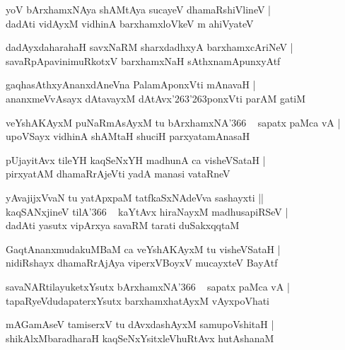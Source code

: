 \documentclass[twoside,12pt,openright]{book}
\def\S{\char'263}
\newcounter{shloka}[chapter]
\begin{document}
\begin{shloka}
yoV bArxhamxNAya shAMtAya sucayeV dhamaRshiVlineV |\\
dadAti vidAyxM vidhinA barxhamxloVkeV m ahiVyateV 
\end{shloka}

\begin{shloka}
dadAyxdaharahaH savxNaRM sharxdadhxyA barxhamxcAriNeV |\\
savaRpApavinimuRkotxV barxhamxNaH sAthxnamApunxyAtf 
\end{shloka}

\begin{shloka}
gaqhasAthxyAnanxdAneVna PalamAponxVti mAnavaH |\\
ananxmeVvAsayx dAtavayxM dAtAvx\S\S ponxVti parAM  gatiM 
\end{shloka}

\begin{shloka}
veYshAKAyxM puNaRmAsAyxM tu bArxhamxNA\char'366 ~ sapatx paMca vA |\\
upoVSayx vidhinA shAMtaH shuciH parxyatamAnasaH 
\end{shloka}

\begin{shloka}
pUjayitAvx tileYH kaqSeNxYH madhunA ca visheVSataH |\\
pirxyatAM dhamaRrAjeVti yadA manasi vataRneV 
\end{shloka}

\begin{shloka}
yAvajijxVvaN  tu yatApxpaM tatfkaSxNAdeVva sashayxti ||\\
kaqSANxjineV tilA\char'366 ~ kaYtAvx hiraNayxM madhusapiRSeV |\\
dadAti yasutx vipArxya savaRM tarati duSakxqqtaM 
\end{shloka}

\begin{shloka}
GaqtAnanxmudakuMBaM ca veYshAKAyxM tu visheVSataH |\\
nidiRshayx dhamaRrAjAya viperxVBoyxV mucayxteV BayAtf 
\end{shloka}

\begin{shloka}
savaNARtilayuketxYsutx bArxhamxNA\char'366 ~ sapatx paMca vA |\\
tapaRyeVdudapaterxYsutx barxhamxhatAyxM vAyxpoVhati 
\end{shloka}

\begin{shloka}
mAGamAseV tamiserxV tu dAvxdashAyxM samupoVshitaH |\\
shikAlxMbaradharaH kaqSeNxYsitxleVhuRtAvx hutAshanaM 
\end{shloka}
\end{document}

